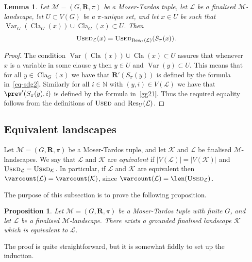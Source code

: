 \documentclass[12pt,a4paper]{article}
\numberwithin{equation}{section}
\newtheorem{lemma}[equation]{Lemma}
\newtheorem{proposition}[equation]{Proposition}
\theoremstyle{definition}
\newcommand\NN{\mathbb N}
\renewcommand{\cal}[1]{{\mathcal #1}}
\newcommand\Var{\operatorname{Var}}
\newcommand\Cl{\operatorname{Cla}}
\newcommand{\used}{\textsc{Used}}
\begin{document}
    \begin{lemma}\label{lem-restrict}
    Let $\cal M = (G, \mathbf R,  \pi)$ be a Moser-Tardos tuple, let $\cal L$ be a finalised $\cal M$-landscape, let $U\subset V(G)$ be a $\pi$-unique set, and let $x\in U$ be such that $\Var_G(\Cl_G(x))\cup \Cl_G(x)\subset U$. Then 
    $$
    \used_{\cal L}(x) = \used_{\Res_U(\cal L)} (S_\pi(x)).
    $$ 
    \end{lemma}
    \begin{proof}
    The condition $\Var(\Cl(x))\cup \Cl(x)\subset U$ assures that whenever $x$ is a variable in some clause $y$ then $y\in U$ and $\Var(y) \subset U$. This means that for all $y\in \Cl_G(x)$ we have that $\mathbf R' (S_\pi(y))$ is defined by the formula in~\eqref{eq-sdg2}. Similarly for all $i\in\NN$ with $(y,i)\in V(\cal L)$ we have that  $\prev'(S_\pi(y),i)$ is defined by the formula in~\eqref{gg21}. Thus the required equality follows from the definitions of $\used$ and $\Res_U(\cal L)$. 
    \end{proof}
    
    
    
    \subsection{Equivalent landscapes}\label{subsec-equiv}
    \newcommand{\G}{\operatorname{G}}
    \newcommand{\Push}{\operatorname{Push}}
    
    Let $\cal M = (G, \mathbf R,  \pi)$ be a Moser-Tardos tuple, and let $\cal K$ and $\cal L$ be finalised $\cal M$-landscapes. We say that $\cal L$ and $\cal K$ are \emph{equivalent} if $|V(\cal L)| = |V(\cal K)|$ and $\used_{\cal L} = \used_{\cal K}$. In particular, if $\cal L$ and $\cal K$ are equivalent then $\varcount(\cal L) = \varcount(\cal K)$, since  $\varcount(\cal L) = \len(\used_{\cal L})$.
    
    The purpose of this subsection is to prove the following proposition.
    
    \begin{proposition}\label{prop-equiv}
    Let $\cal M = (G, \mathbf R,  \pi)$ be a Moser-Tardos tuple with finite $G$, and let $\cal L$ be a finalised $\cal M$-landscape. There exists a grounded finalised landscape $\cal K$ which is equivalent to $\cal L$.
    \end{proposition}
    
    The proof is quite straightforward, but it is somewhat fiddly to set up the induction. 
    
\end{document}
